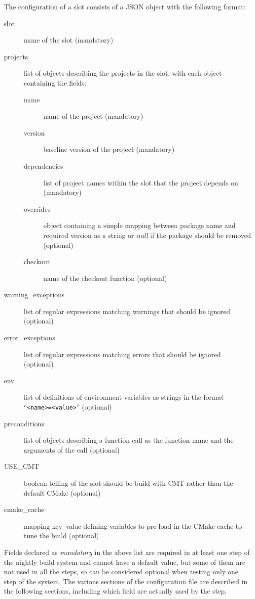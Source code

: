 The configuration of a slot consists of a JSON object with the following format:
\begin{description}
  \item[slot] name of the slot (mandatory)
  \item[projects] list of objects describing the projects in the slot, with each
  object containing the fields:
  \begin{description}
    \item[name] name of the project (mandatory)
    \item[version] baseline version of the project (mandatory)
    \item[dependencies] list of project names within the slot that the project
depends on (mandatory)
    \item[overrides] object containing a simple mapping between package name and
required version as a string or \emph{null} if the package should be removed
(optional)
    \item[checkout] name of the checkout function (optional)
  \end{description}
  \item[warning\_exceptions] list of regular expressions matching warnings that
  should be ignored (optional)
  \item[error\_exceptions] list of regular expressions matching errors that
  should be ignored (optional)
  \item[env] list of definitions of environment variables as strings in the
  format ``\texttt{<name>=<value>}'' (optional)
  \item[preconditions] list of objects describing a function call as the
  function name and the arguments of the call (optional)
  \item[USE\_CMT] boolean telling of the slot should be build with CMT rather
  than the default CMake (optional)
  \item[cmake\_cache] mapping key--value defining variables to pre-load in the
  CMake cache to tune the build (optional)
\end{description}
Fields declared as \emph{mandatory} in the above list are required in at least
one step of the nightly build system and cannot have a default value, but some
of them are not used in all the steps, so can be considered optional when
testing only one step of the system.  The various sections of the configuration
file are described in the following sections, including which field are actually
used by the step.

